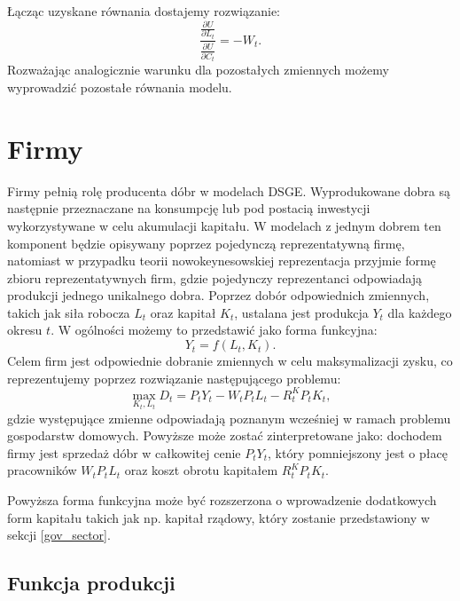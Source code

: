 Łącząc uzyskane równania dostajemy rozwiązanie:
\begin{equation}
    \frac{\frac{\partial U}{\partial L_t}}{\frac{\partial U}{\partial C_t}} = -W_t.
\end{equation}
Rozważając analogicznie warunku dla pozostałych zmiennych możemy wyprowadzić pozostałe równania modelu.

\section{Firmy}
\label{sec:firms}

Firmy pełnią rolę producenta dóbr w modelach DSGE. Wyprodukowane dobra są następnie przeznaczane na konsumpcję lub pod postacią inwestycji wykorzystywane w celu akumulacji kapitału. W modelach z jednym dobrem ten komponent będzie opisywany poprzez pojedynczą reprezentatywną firmę, natomiast w przypadku teorii nowokeynesowskiej reprezentacja przyjmie formę zbioru reprezentatywnych firm, gdzie pojedynczy reprezentanci odpowiadają produkcji jednego unikalnego dobra. Poprzez dobór odpowiednich zmiennych, takich jak siła robocza $L_t$ oraz kapitał $K_t$, ustalana jest produkcja $Y_t$ dla każdego okresu $t$. W ogólności możemy to przedstawić jako forma funkcyjna:
\begin{equation}
    Y_t = f(L_t, K_t).
\end{equation}
Celem firm jest odpowiednie dobranie zmiennych w celu maksymalizacji zysku, co reprezentujemy poprzez rozwiązanie następującego problemu:
\begin{equation}
\label{eqn:firmProblem}
    \max\limits_{K_t, L_t} D_t = P_t Y_t - W_t P_t L_t - R^K_t P_t K_t,
\end{equation}
gdzie występujące zmienne odpowiadają poznanym wcześniej w ramach problemu gospodarstw domowych. Powyższe może zostać zinterpretowane jako: dochodem firmy jest sprzedaż dóbr w całkowitej cenie $P_t Y_t$, który pomniejszony jest o płacę pracowników $W_t P_t L_t$ oraz koszt obrotu kapitałem $R^K_t P_t K_t$.

Powyższa forma funkcyjna może być rozszerzona o wprowadzenie dodatkowych form kapitału takich jak np. kapitał rządowy, który zostanie przedstawiony w sekcji \ref{gov_sector}.

\subsection{Funkcja produkcji}


